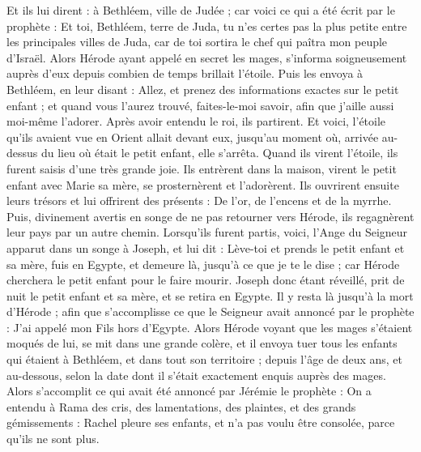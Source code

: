 \begin{multicols}{2}
Et ils lui dirent : à Bethléem, ville de Judée ; car voici ce qui a été écrit par le prophète :
Et toi, Bethléem, terre de Juda, tu n'es certes pas la plus petite entre les principales villes de Juda, car de toi sortira le chef qui paîtra mon peuple d'Israël{}.
Alors Hérode ayant appelé en secret les mages, s'informa soigneusement auprès d’eux depuis combien de temps brillait l'étoile.
Puis les envoya à Bethléem, en leur disant : Allez, et prenez des informations exactes sur le petit enfant ; et quand vous l'aurez trouvé, faites-le-moi savoir, afin que j’aille aussi moi-même l’adorer.
Après avoir entendu le roi, ils partirent. Et voici, l'étoile{} qu'ils avaient vue en Orient allait devant eux, jusqu’au moment où, arrivée au-dessus du lieu où était le petit enfant, elle s’arrêta.
Quand ils virent l'étoile, ils furent saisis d’une très grande joie.
Ils entrèrent dans la maison, virent le petit enfant avec Marie sa mère, se prosternèrent et l’adorèrent. Ils ouvrirent ensuite leurs trésors et lui offrirent des présents : De l'or, de l'encens et de la myrrhe.
Puis, divinement avertis en songe de ne pas retourner vers Hérode, ils regagnèrent leur pays par un autre chemin.
Lorsqu’ils furent partis, voici, l’Ange du Seigneur apparut dans un songe à Joseph, et lui dit : Lève-toi et prends le petit enfant et sa mère, fuis en Egypte, et demeure là, jusqu'à ce que je te le dise ; car Hérode cherchera le petit enfant pour le faire mourir.
Joseph donc étant réveillé, prit de nuit le petit enfant et sa mère, et se retira en Egypte.
Il y resta là jusqu’à la mort d'Hérode ; afin que s’accomplisse ce que le Seigneur avait annoncé par le prophète : J'ai appelé mon Fils hors d'Egypte{}.
Alors Hérode voyant que les mages s'étaient moqués de lui, se mit dans une grande colère, et il envoya tuer tous les enfants qui étaient à Bethléem, et dans tout son territoire ; depuis l'âge de deux ans, et au-dessous, selon la date dont il s'était exactement enquis auprès des mages.
Alors s’accomplit ce qui avait été annoncé par Jérémie le prophète :
On a entendu à Rama des cris, des lamentations, des plaintes, et des grands gémissements : Rachel pleure ses enfants, et n’a pas voulu être consolée, parce qu’ils ne sont plus{}.

\end{multicols}
